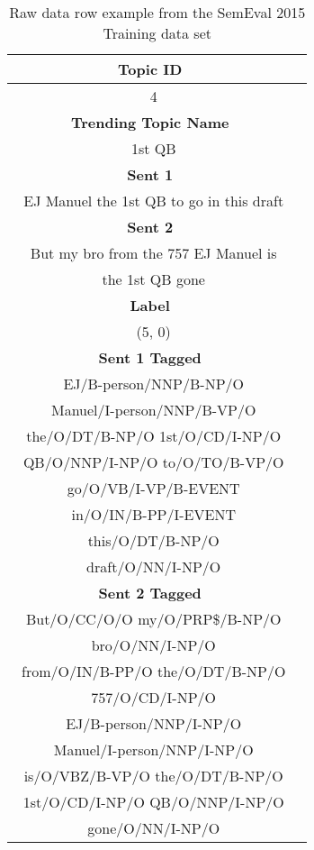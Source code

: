 \documentclass[11pt,letterpaper]{article}
\begin{document}
\begin{table}
\begin{center}
\begin{tabularx}{190pt}{|c|c|}
\hline
\bf Topic ID \\
\hline
\ 4 \\
\hline
\bf Trending Topic Name \\
\hline
\ 1st QB\\
\hline
\bf Sent 1 \\
\hline
\ EJ Manuel the 1st QB to go in this draft \\
\hline
\bf Sent 2 \\
\hline
\ But my bro from the 757 EJ Manuel is\\ 
\ the 1st QB gone \\
\hline
\bf Label \\
\hline
\ (5, 0) \\
\hline
\bf Sent 1 Tagged \\
\hline
\ EJ/B-person/NNP/B-NP/O \\
\ Manuel/I-person/NNP/B-VP/O \\
\ the/O/DT/B-NP/O 1st/O/CD/I-NP/O \\
\ QB/O/NNP/I-NP/O to/O/TO/B-VP/O \\
\ go/O/VB/I-VP/B-EVENT \\
\ in/O/IN/B-PP/I-EVENT \\ 
\ this/O/DT/B-NP/O \\ 
\ draft/O/NN/I-NP/O \\
\hline
\bf Sent 2 Tagged \\
\hline
\ But/O/CC/O/O my/O/PRP\$/B-NP/O \\
\ bro/O/NN/I-NP/O \\ 
\ from/O/IN/B-PP/O the/O/DT/B-NP/O \\
\ 757/O/CD/I-NP/O \\
\ EJ/B-person/NNP/I-NP/O \\
\ Manuel/I-person/NNP/I-NP/O \\
\ is/O/VBZ/B-VP/O the/O/DT/B-NP/O \\ 
\ 1st/O/CD/I-NP/O QB/O/NNP/I-NP/O \\
\ gone/O/NN/I-NP/O \\
\hline
\end{tabularx}
\end{center}
\caption{\label{provided-data} Raw data row example from the SemEval 2015 Training data set }
\end{table}
\end{document}
